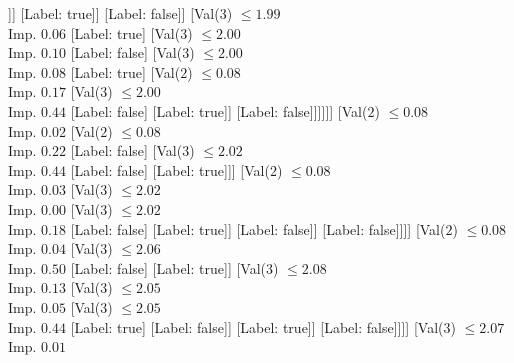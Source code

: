 \documentclass[margin=10pt]{standalone}
\begin{document}
\begin{forest}
										[Val($3$) $ \leq 1.99$ \\ Imp. $0.09$
											[Val($3$) $ \leq 1.98$ \\ Imp. $0.02$
												[Val($3$) $ \leq 1.98$ \\ Imp. $0.14$
													[Val($3$) $ \leq 1.98$ \\ Imp. $0.05$
														[Label: false]
														[Val($3$) $ \leq 1.98$ \\ Imp. $0.44$
															[Label: true]
															[Label: false]]]
													[Label: true]]
												[Label: false]]
											[Val($3$) $ \leq 1.99$ \\ Imp. $0.06$
												[Label: true]
												[Val($3$) $ \leq 2.00$ \\ Imp. $0.10$
													[Label: false]
													[Val($3$) $ \leq 2.00$ \\ Imp. $0.08$
														[Label: true]
														[Val($2$) $ \leq 0.08$ \\ Imp. $0.17$
															[Val($3$) $ \leq 2.00$ \\ Imp. $0.44$
																[Label: false]
																[Label: true]]
															[Label: false]]]]]]
										[Val($2$) $ \leq 0.08$ \\ Imp. $0.02$
											[Val($2$) $ \leq 0.08$ \\ Imp. $0.22$
												[Label: false]
												[Val($3$) $ \leq 2.02$ \\ Imp. $0.44$
													[Label: false]
													[Label: true]]]
											[Val($2$) $ \leq 0.08$ \\ Imp. $0.03$
												[Val($3$) $ \leq 2.02$ \\ Imp. $0.00$
													[Val($3$) $ \leq 2.02$ \\ Imp. $0.18$
														[Label: false]
														[Label: true]]
													[Label: false]]
												[Label: false]]]]
									[Val($2$) $ \leq 0.08$ \\ Imp. $0.04$
										[Val($3$) $ \leq 2.06$ \\ Imp. $0.50$
											[Label: false]
											[Label: true]]
										[Val($3$) $ \leq 2.08$ \\ Imp. $0.13$
											[Val($3$) $ \leq 2.05$ \\ Imp. $0.05$
												[Val($3$) $ \leq 2.05$ \\ Imp. $0.44$
													[Label: true]
													[Label: false]]
												[Label: true]]
											[Label: false]]]]
								[Val($3$) $ \leq 2.07$ \\ Imp. $0.01$

\end{forest}
\end{document}
